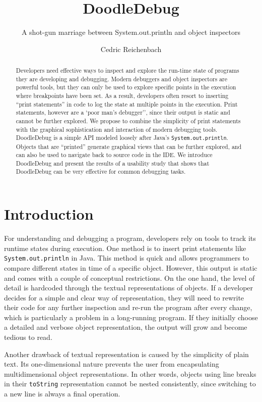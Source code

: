 \documentclass[english]{scrartcl}
\newcommand{\DD}{Dood\-le\-De\-bug\xspace}
\newcommand{\println}{\texttt{Sys\-tem.\-out.\-println}\xspace}
\begin{document}
\title{DoodleDebug}
\author{Cedric Reichenbach}
\subtitle{A shot-gun marriage between System.out.println and object inspectors}
\maketitle

\begin{abstract}
Developers need effective ways to inspect and explore the run-time state of programs they are developing and debugging.  Modern debuggers and object inspectors are powerful tools, but they can only be used to explore specific points in the execution where breakpoints have been set. As a result, developers often resort to inserting ``print statements'' in code to log the state at multiple points in the execution. Print statements, however are a `poor man's debugger'', since their output is static and cannot be further explored.
We propose to combine the simplicity of print statements with the graphical sophistication and interaction of modern debugging tools.
\DD is a simple API modeled loosely after Java's \println. Objects that are ``printed'' generate graphical views that can be further explored, and can also be used to navigate back to source code in the IDE.
We introduce \DD and present the results of a usability study that shows that \DD can be very effective for common debugging tasks.
\end{abstract}

\section{Introduction}

For understanding and debugging a program, developers rely on tools to track its runtime states during execution.
One method is to insert print statements like \println in Java.
This method is quick and allows programmers to compare different states in time of a specific object.
However, this output is static and comes with a couple of conceptual restrictions. On the one hand, the level of detail is hardcoded through the textual representations of objects.
If a developer decides for a simple and clear way of representation, they will need to rewrite their code for any further inspection and re-run the program after every change, which is particularly a problem in a long-running program.
If they initially choose a detailed and verbose object representation, the output will grow and become tedious to read.

Another drawback of textual representation is caused by the simplicity of plain text.
Its one-dimensional nature prevents the user from encapsulating multidimensional object representations.
In other words, objects using line breaks in their \texttt{toString} representation cannot be nested consistently, since switching to a new line is always a final operation.
\end{document}

